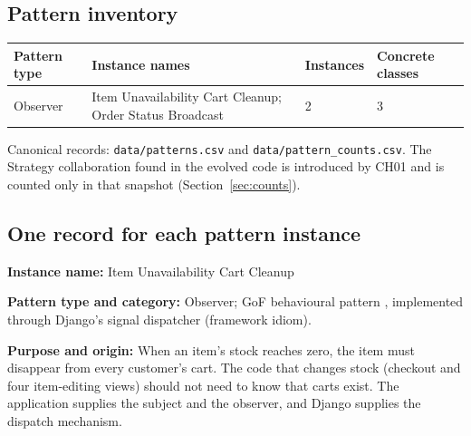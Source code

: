 \documentclass[11pt,a4paper]{article}
\newcommand{\entry}[1]{\par\textbf{#1:} }
\newcommand{\code}[1]{\nolinkurl{#1}}
\begin{document}
\subsection{Pattern inventory}
\begin{tabularx}{\linewidth}{@{}lXll@{}}\toprule
Pattern type & Instance names & Instances & Concrete classes\\\midrule
Observer & Item Unavailability Cart Cleanup; Order Status Broadcast & 2 & 3\\\bottomrule
\end{tabularx}

Canonical records: \code{data/patterns.csv} and \code{data/pattern_counts.csv}. The Strategy collaboration found in the evolved code is introduced by CH01 and is counted only in that snapshot (Section~\ref{sec:counts}).

\subsection{One record for each pattern instance}
\entry{Instance name}Item Unavailability Cart Cleanup
\entry{Pattern type and category}Observer; GoF behavioural pattern \cite{gof}, implemented through Django's signal dispatcher (framework idiom).
\entry{Purpose and origin}When an item's stock reaches zero, the item must disappear from every customer's cart. The code that changes stock (checkout and four item-editing views) should not need to know that carts exist. The application supplies the subject and the observer, and Django supplies the dispatch mechanism.
\end{document}
